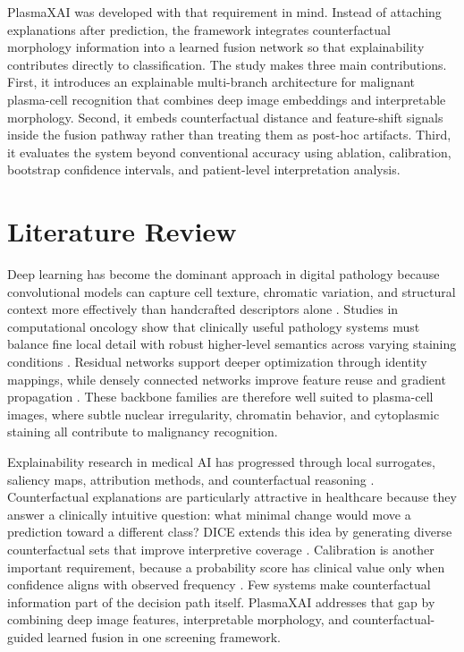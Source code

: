 \documentclass[runningheads]{llncs}
\begin{document}
PlasmaXAI was developed with that requirement in mind. Instead of attaching explanations after prediction, the framework integrates counterfactual morphology information into a learned fusion network so that explainability contributes directly to classification. The study makes three main contributions. First, it introduces an explainable multi-branch architecture for malignant plasma-cell recognition that combines deep image embeddings and interpretable morphology. Second, it embeds counterfactual distance and feature-shift signals inside the fusion pathway rather than treating them as post-hoc artifacts. Third, it evaluates the system beyond conventional accuracy using ablation, calibration, bootstrap confidence intervals, and patient-level interpretation analysis.

\section{Literature Review}
Deep learning has become the dominant approach in digital pathology because convolutional models can capture cell texture, chromatic variation, and structural context more effectively than handcrafted descriptors alone \cite{litjens,janowczyk}. Studies in computational oncology show that clinically useful pathology systems must balance fine local detail with robust higher-level semantics across varying staining conditions \cite{bera,campanella}. Residual networks support deeper optimization through identity mappings, while densely connected networks improve feature reuse and gradient propagation \cite{resnet,densenet}. These backbone families are therefore well suited to plasma-cell images, where subtle nuclear irregularity, chromatin behavior, and cytoplasmic staining all contribute to malignancy recognition.

Explainability research in medical AI has progressed through local surrogates, saliency maps, attribution methods, and counterfactual reasoning \cite{lime,gradcam,shap,wachter}. Counterfactual explanations are particularly attractive in healthcare because they answer a clinically intuitive question: what minimal change would move a prediction toward a different class? DICE extends this idea by generating diverse counterfactual sets that improve interpretive coverage \cite{diceml}. Calibration is another important requirement, because a probability score has clinical value only when confidence aligns with observed frequency \cite{calibration}. Few systems make counterfactual information part of the decision path itself. PlasmaXAI addresses that gap by combining deep image features, interpretable morphology, and counterfactual-guided learned fusion in one screening framework.
\end{document}
